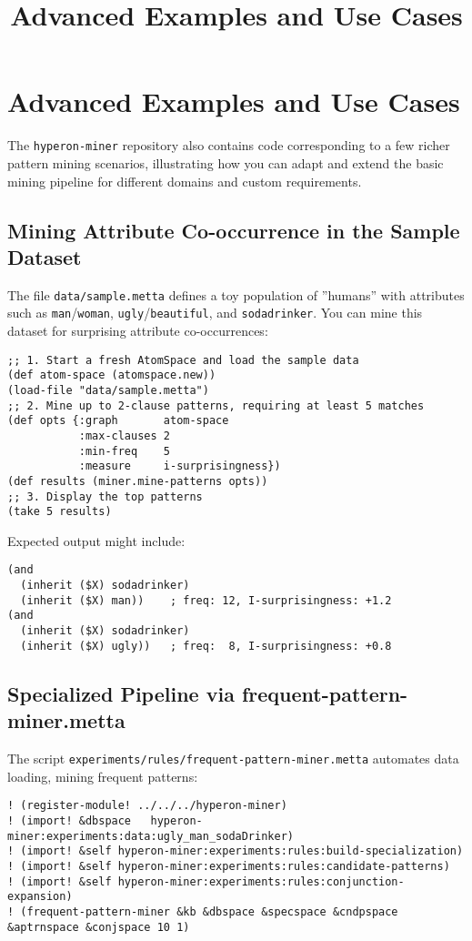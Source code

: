 \documentclass{article}
\title{Advanced Examples and Use Cases}
\begin{document}
\section{Advanced Examples and Use Cases}

The \texttt{hyperon-miner} repository also contains code corresponding to a few richer pattern mining scenarios, illustrating how you can adapt and extend the basic mining pipeline for different domains and custom requirements.

\subsection{Mining Attribute Co-occurrence in the Sample Dataset}

The file \texttt{data/sample.metta} defines a toy population of ''humans'' with attributes such as \texttt{man}/\texttt{woman}, \texttt{ugly}/\texttt{beautiful}, and \texttt{sodadrinker}.  You can mine this dataset for surprising attribute co-occurrences:

\begin{verbatim}
;; 1. Start a fresh AtomSpace and load the sample data
(def atom-space (atomspace.new))
(load-file "data/sample.metta")
;; 2. Mine up to 2-clause patterns, requiring at least 5 matches
(def opts {:graph       atom-space
           :max-clauses 2
           :min-freq    5
           :measure     i-surprisingness})
(def results (miner.mine-patterns opts))
;; 3. Display the top patterns
(take 5 results)
\end{verbatim}

Expected output might include:

\begin{verbatim}
(and 
  (inherit ($X) sodadrinker)
  (inherit ($X) man))    ; freq: 12, I-surprisingness: +1.2
(and 
  (inherit ($X) sodadrinker)
  (inherit ($X) ugly))   ; freq:  8, I-surprisingness: +0.8
\end{verbatim}

\subsection{Specialized Pipeline via frequent-pattern-miner.metta}

The script \texttt{experiments/rules/frequent-pattern-miner.metta} automates data loading, mining frequent patterns:

\begin{verbatim}
! (register-module! ../../../hyperon-miner)
! (import! &dbspace   hyperon-miner:experiments:data:ugly_man_sodaDrinker)
! (import! &self hyperon-miner:experiments:rules:build-specialization)
! (import! &self hyperon-miner:experiments:rules:candidate-patterns)
! (import! &self hyperon-miner:experiments:rules:conjunction-expansion)
! (frequent-pattern-miner &kb &dbspace &specspace &cndpspace &aptrnspace &conjspace 10 1)
\end{verbatim}
\end{document}
